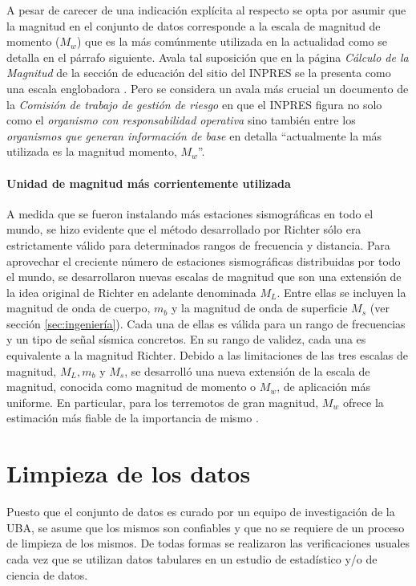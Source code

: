 \documentclass[a4paper]{report}
\begin{document}
A pesar de carecer de una indicación explícita al respecto se opta por asumir que la magnitud en el conjunto de datos corresponde a la escala de magnitud de momento (\(M_w\)) que es la más comúnmente utilizada en la actualidad como se detalla en el párrafo siguiente.
Avala tal suposición que en la página \emph{Cálculo de la Magnitud} de la sección de educación del sitio del INPRES se la presenta como una escala englobadora \cite{noauthor_calculo_2022}.
Pero se considera un avala más crucial un documento de la \emph{Comisión de trabajo de gestión de riesgo} en que el INPRES figura no solo como el \emph{organismo con responsabilidad operativa} sino también entre los \emph{organismos que generan información de base} en \cite[anéxo X]{noauthor_sismos_2015} detalla ``actualmente la más utilizada es la magnitud momento, \(M_w\)''.  


\paragraph{Unidad de magnitud más corrientemente utilizada}
A medida que se fueron instalando más estaciones sismográficas en todo el mundo, se hizo evidente que el método desarrollado por Richter sólo era estrictamente válido para determinados rangos de frecuencia y distancia.
Para aprovechar el creciente número de estaciones sismográficas distribuidas por todo el mundo, se desarrollaron nuevas escalas de magnitud que son una extensión de la idea original de Richter en adelante denominada \(M_L\).
Entre ellas se incluyen la magnitud de onda de cuerpo, \(m_b\) y la magnitud de onda de superficie \(M_s\) (ver sección \ref{sec:ingeniería}).
Cada una de ellas es válida para un rango de frecuencias y un tipo de señal sísmica concretos.
En su rango de validez, cada una es equivalente a la magnitud Richter.
Debido a las limitaciones de las tres escalas de magnitud, \(M_L, m_b\) y \(M_s\), se desarrolló una nueva extensión de la escala de magnitud, conocida como magnitud de momento o \(M_w\), de aplicación más uniforme.
En particular, para los terremotos de gran magnitud, \(M_w\) ofrece la estimación más fiable de la importancia de mismo \cite{noauthor_moment_nodate}.
	



\section{Limpieza de los datos}

Puesto que el conjunto de datos es curado por un equipo de investigación de la UBA, se asume que los mismos son confiables y que no se requiere de un proceso de limpieza de los mismos.
De todas formas se realizaron las verificaciones usuales cada vez que se utilizan datos tabulares en un estudio de estadístico y/o de ciencia de datos.
\end{document}
